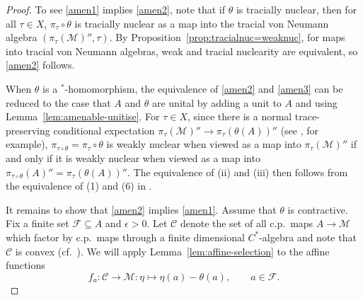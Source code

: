 \documentclass[a4paper,11pt]{amsart}
\theoremstyle{definition}
\numberwithin{equation}{section}
\numberwithin{theorem}{section}
\newcommand{\M}{\mathcal{M}}
\begin{document}
\begin{proof}
	To see \ref{amen1} implies \ref{amen2}, note that if $\theta$ is tracially nuclear, then for all $\tau \in X$, $\pi_\tau \circ \theta$ is tracially nuclear as a map into the tracial von Neumann algebra $(\pi_\tau(\mathcal M)'', \tau)$.  By Proposition~\ref{prop:tracialnuc=weaknuc}, for maps into tracial von Neumann algebras, weak and tracial nuclearity are equivalent, so \ref{amen2} follows.
	
	When $\theta$ is a $^*$-homomorphism, the equivalence of \ref{amen2} and \ref{amen3} can be reduced to the case that $A$ and $\theta$ are unital by adding a unit to $A$ and using Lemma~\ref{lem:amenable-unitise}. For $\tau \in X$, since there is a normal trace-preserving conditional expectation $\pi_\tau(\M)'' \rightarrow \pi_\tau(\theta(A))''$ (see \cite[Lemma 1.5.10]{Br08}, for example), $\pi_{\tau \circ \theta} = \pi_\tau \circ \theta$ is weakly nuclear when viewed as a map into $\pi_\tau(\M)''$ if and only if it is weakly nuclear when viewed as a map into $\pi_{\tau \circ \theta}(A)'' = \pi_\tau(\theta(A))''$.  The equivalence of (ii) and (iii) then follows from the equivalence of (1) and (6) in  \cite[Theorem~3.2.2]{Bro06}.
	
	It remains to show that \ref{amen2} implies \ref{amen1}.  Assume that $\theta$ is contractive. Fix a finite set $\mathcal F \subseteq A$ and $\epsilon > 0$.  Let $\mathcal C$ denote the set of all c.p.\ maps $A \rightarrow \M$ which factor by c.p.\ maps through a finite dimensional $C^*$-algebra and note that $\mathcal C$ is convex (cf.~\cite[Lemma~2.3.6]{Br08}).  We will apply Lemma~\ref{lem:affine-selection} to the affine functions
	\begin{equation} 
		f_a \colon \mathcal C \rightarrow \M \colon \eta \mapsto \eta(a) - \theta(a), \qquad a \in \mathcal F.
	\end{equation}
	

\end{proof}
\end{document}
